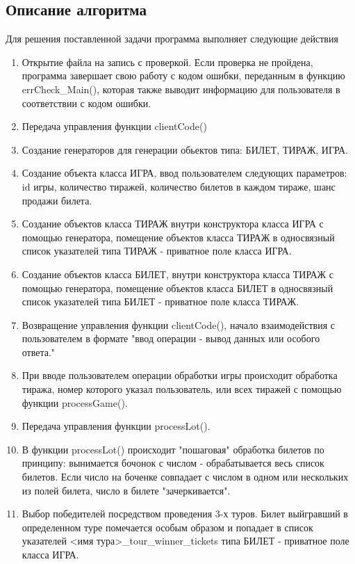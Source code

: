 \documentclass[a4paper,14pt]{article}
\begin{document}
\subsection{Описание алгоритма}
Для решения поставленной задачи программа выполняет следующие действия\newline
\begin{enumerate} 
  \item Открытие файла на запись с проверкой. Если проверка не пройдена, программа завершает свою работу с кодом ошибки, переданным в функцию errCheck\_Main(), которая также выводит информацию для пользователя в соответствии с кодом ошибки.
  \item Передача управления функции clientCode()
  \item Создание генераторов для генерации обьектов типа: БИЛЕТ, ТИРАЖ, ИГРА.
  \item Создание объекта класса ИГРА, ввод пользователем следующих параметров: id игры, количество тиражей, количество билетов в каждом тираже, шанс продажи билета.
  \item Создание объектов класса ТИРАЖ внутри конструктора класса ИГРА с помощью генератора, помещение объектов класса ТИРАЖ в односвязный список указателей типа ТИРАЖ - приватное поле класса ИГРА. 
  \item Создание объектов класса БИЛЕТ, внутри конструктора класса ТИРАЖ с помощью генератора, помещение объектов класса БИЛЕТ в односвязный список указателей типа БИЛЕТ - приватное поле класса ТИРАЖ. 
  \item Возвращение управления функции clientCode(), начало взаимодействия с пользователем в формате "ввод операции - вывод данных или особого ответа."
  \item При вводе пользователем операции обработки игры происходит обработка тиража, номер которого указал пользователь, или всех тиражей с помощью функции processGame().
  \item Передача управления функции processLot().
  \item В функции processLot() происходит "пошаговая" обработка билетов по принципу: вынимается бочонок с числом - обрабатывается весь список билетов. Если число на боченке совпадает с числом в одном или нескольких из полей билета, число в билете "зачеркивается".
  \item Выбор победителей посредством проведения 3-х туров. Билет выйгравший в определенном туре помечается особым образом и попадает в список указателей <имя тура>\_tour\_winner\_tickets типа БИЛЕТ - приватное поле класса ИГРА.

\end{enumerate}
\end{document}
